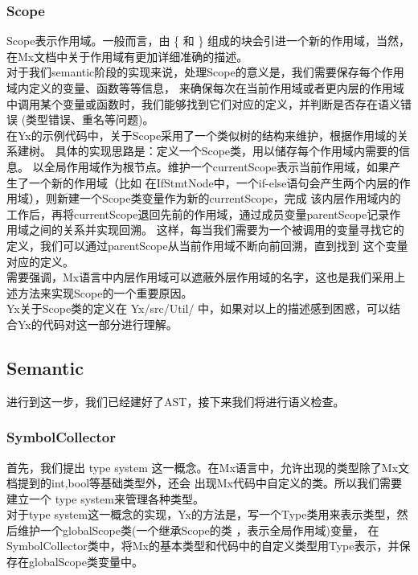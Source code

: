 \subsubsection{Scope}
Scope表示作用域。一般而言，由 \{ 和 \} 组成的块会引进一个新的作用域，当然，在Mx文档中关于作用域有更加详细准确的描述。\\

对于我们semantic阶段的实现来说，处理Scope的意义是，我们需要保存每个作用域内定义的变量、函数等等信息，
来确保每次在当前作用域或者更内层的作用域中调用某个变量或函数时，我们能够找到它们对应的定义，并判断是否存在语义错误
(类型错误、重名等问题)。\\

在Yx的示例代码中，关于Scope采用了一个类似树的结构来维护，根据作用域的关系建树。
具体的实现思路是：定义一个Scope类，用以储存每个作用域内需要的信息。
以全局作用域作为根节点。维护一个currentScope表示当前作用域，如果产生了一个新的作用域（比如
在IfStmtNode中，一个if-else语句会产生两个内层的作用域），则新建一个Scope类变量作为新的currentScope，完成
该内层作用域内的工作后，再将currentScope退回先前的作用域，通过成员变量parentScope记录作用域之间的关系并实现回溯。
这样，每当我们需要为一个被调用的变量寻找它的定义，我们可以通过parentScope从当前作用域不断向前回溯，直到找到
这个变量对应的定义。\\

需要强调，Mx语言中内层作用域可以遮蔽外层作用域的名字，这也是我们采用上述方法来实现Scope的一个重要原因。\\

Yx关于Scope类的定义在 Yx/src/Util/ 中，如果对以上的描述感到困惑，可以结合Yx的代码对这一部分进行理解。

\subsection{Semantic}
进行到这一步，我们已经建好了AST，接下来我们将进行语义检查。\\

\subsubsection{SymbolCollector}
首先，我们提出 type system 这一概念。在Mx语言中，允许出现的类型除了Mx文档提到的int,bool等基础类型外，还会
出现Mx代码中自定义的类。所以我们需要建立一个 type system来管理各种类型。\\

对于type system这一概念的实现，Yx的方法是，写一个Type类用来表示类型，然后维护一个globalScope类(一个继承Scope的类
，表示全局作用域)变量，
在SymbolCollector类中，将Mx的基本类型和代码中的自定义类型用Type表示，并保存在globalScope类变量中。 \\

